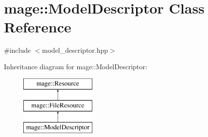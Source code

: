 \hypertarget{classmage_1_1_model_descriptor}{}\section{mage\+:\+:Model\+Descriptor Class Reference}
\label{classmage_1_1_model_descriptor}


{\ttfamily \#include $<$model\+\_\+descriptor.\+hpp$>$}

Inheritance diagram for mage\+:\+:Model\+Descriptor\+:\begin{figure}[H]
\begin{center}
\leavevmode
\includegraphics[height=3.000000cm]{classmage_1_1_model_descriptor}
\end{center}
\end{figure}

